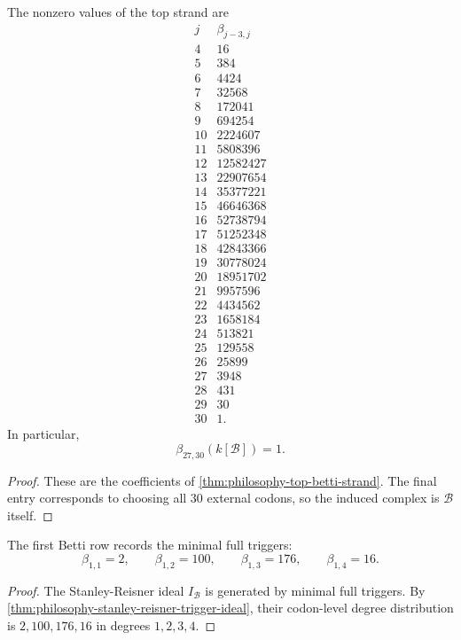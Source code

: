 \begin{corollary}
\label{cor:philosophy-top-betti-strand-values}
The nonzero values of the top strand are
$$
\begin{array}{c|r}
  j & \beta_{j-3,j}\\
  \hline
  4 & 16\\
  5 & 384\\
  6 & 4424\\
  7 & 32568\\
  8 & 172041\\
  9 & 694254\\
  10 & 2224607\\
  11 & 5808396\\
  12 & 12582427\\
  13 & 22907654\\
  14 & 35377221\\
  15 & 46646368\\
  16 & 52738794\\
  17 & 51252348\\
  18 & 42843366\\
  19 & 30778024\\
  20 & 18951702\\
  21 & 9957596\\
  22 & 4434562\\
  23 & 1658184\\
  24 & 513821\\
  25 & 129558\\
  26 & 25899\\
  27 & 3948\\
  28 & 431\\
  29 & 30\\
  30 & 1.
\end{array}
$$
In particular,
$$
  \beta_{27,30}(k[\mathcal{B}])=1.
$$
\end{corollary}
\begin{proof}
These are the coefficients of
\autoref{thm:philosophy-top-betti-strand}. The final entry corresponds
to choosing all $30$ external codons, so the induced complex is
$\mathcal{B}$ itself.
\end{proof}

\begin{corollary}
\label{cor:philosophy-betti-generator-row}
The first Betti row records the minimal full triggers:
$$
  \beta_{1,1}=2,
  \qquad
  \beta_{1,2}=100,
  \qquad
  \beta_{1,3}=176,
  \qquad
  \beta_{1,4}=16.
$$
\end{corollary}
\begin{proof}
The Stanley-Reisner ideal $I_{\mathcal{B}}$ is generated by minimal
full triggers. By \autoref{thm:philosophy-stanley-reisner-trigger-ideal},
their codon-level degree distribution is $2,100,176,16$ in degrees
$1,2,3,4$.
\end{proof}

